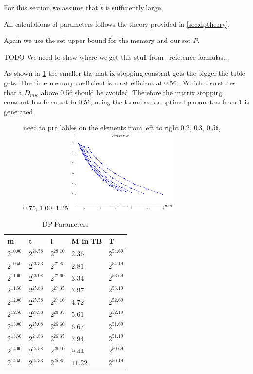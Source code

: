 For this section we assume that $\hat{t}$ is sufficiently large.

All calculations of parameters follows the theory provided in
\ref{sec:dptheory}.

Again we use the set upper bound for the memory and our set $P$.

TODO We need to show where we get this stuff from.. reference
formulas...

As shown in \ref{fig:dpHmsc} the smaller the matrix stopping constant
gets the bigger the table gets, The time memory coefficient is most
efficient at 0.56 \cite{176}. Which also states that a $D_{msc}$ above
0.56 should be avoided. Therefore the matrix stopping constant has been
set to 0.56, using the formulas for optimal parameters from \cite{176}
\ref{tab:DPparam} is generated.
\begin{figure}[H]
  \centering
  need to put lables on the elements from left to right 0.2, 0.3, 0.56, 0.75, 1.00, 1.25
    \includegraphics[width=0.5\textwidth]{figures/compareDmsc.png}
    \label{fig:dpHmsc}
\end{figure}
\begin{table}[H]
  \centering
\begin{tabular}{lllll}
m & t & l & M in TB & T \\\hline
$2^{10.00}$ & $2^{26.58}$ & $2^{28.10}$ & $2.36$ & $2^{54.69}$ \\
$2^{10.50}$ & $2^{26.33}$ & $2^{27.85}$ & $2.81$ & $2^{54.19}$ \\
$2^{11.00}$ & $2^{26.08}$ & $2^{27.60}$ & $3.34$ & $2^{53.69}$ \\
$2^{11.50}$ & $2^{25.83}$ & $2^{27.35}$ & $3.97$ & $2^{53.19}$ \\
$2^{12.00}$ & $2^{25.58}$ & $2^{27.10}$ & $4.72$ & $2^{52.69}$ \\
$2^{12.50}$ & $2^{25.33}$ & $2^{26.85}$ & $5.61$ & $2^{52.19}$ \\
$2^{13.00}$ & $2^{25.08}$ & $2^{26.60}$ & $6.67$ & $2^{51.69}$ \\
$2^{13.50}$ & $2^{24.83}$ & $2^{26.35}$ & $7.94$ & $2^{51.19}$ \\
$2^{14.00}$ & $2^{24.58}$ & $2^{26.10}$ & $9.44$ & $2^{50.69}$ \\
$2^{14.50}$ & $2^{24.33}$ & $2^{25.85}$ & $11.22$ & $2^{50.19}$ \\
\end{tabular}
  \caption{DP Parameters}
  \label{tab:DPparam}
\end{table}


